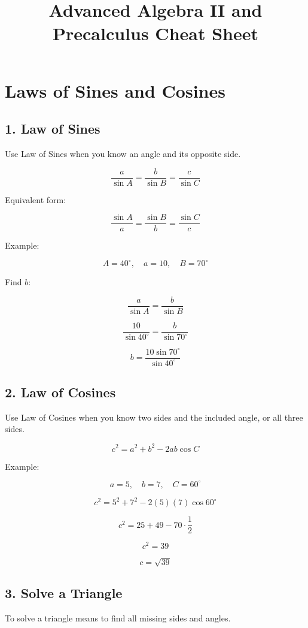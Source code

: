\documentclass[11pt]{article}
\title{Advanced Algebra II and Precalculus Cheat Sheet}
\author{}
\date{}
\begin{document}
\maketitle

\section*{Laws of Sines and Cosines}

\subsection*{1. Law of Sines}

Use Law of Sines when you know an angle and its opposite side.

\[
\frac{a}{\sin A}
=
\frac{b}{\sin B}
=
\frac{c}{\sin C}
\]

Equivalent form:

\[
\frac{\sin A}{a}
=
\frac{\sin B}{b}
=
\frac{\sin C}{c}
\]

Example:

\[
A=40^\circ,\quad a=10,\quad B=70^\circ
\]

Find \(b\):

\[
\frac{a}{\sin A}=\frac{b}{\sin B}
\]

\[
\frac{10}{\sin40^\circ}
=
\frac{b}{\sin70^\circ}
\]

\[
b=
\frac{10\sin70^\circ}{\sin40^\circ}
\]

\subsection*{2. Law of Cosines}

Use Law of Cosines when you know two sides and the included angle, or all three sides.

\[
c^2=a^2+b^2-2ab\cos C
\]

Example:

\[
a=5,\quad b=7,\quad C=60^\circ
\]

\[
c^2=5^2+7^2-2(5)(7)\cos60^\circ
\]

\[
c^2=25+49-70\cdot\frac{1}{2}
\]

\[
c^2=39
\]

\[
c=\sqrt{39}
\]

\subsection*{3. Solve a Triangle}

To solve a triangle means to find all missing sides and angles.
\end{document}
